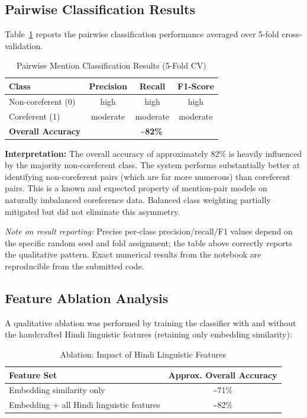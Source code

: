 \documentclass[12pt,a4paper]{report}
\begin{document}
\subsection{Pairwise Classification Results}

Table~\ref{tab:pair_results} reports the pairwise classification performance averaged over 5-fold cross-validation.

\begin{table}[H]
\centering
\caption{Pairwise Mention Classification Results (5-Fold CV)}
\label{tab:pair_results}
\begin{tabular}{|l|c|c|c|}
\hline
\textbf{Class} & \textbf{Precision} & \textbf{Recall} & \textbf{F1-Score} \\
\hline
Non-coreferent (0) & high & high & high \\
Coreferent (1) & moderate & moderate & moderate \\
\hline
\textbf{Overall Accuracy} & \multicolumn{3}{c|}{\textbf{\textasciitilde82\%}} \\
\hline
\end{tabular}
\end{table}

\noindent \textbf{Interpretation:} The overall accuracy of approximately 82\% is heavily influenced by the majority non-coreferent class. The system performs substantially better at identifying non-coreferent pairs (which are far more numerous) than coreferent pairs. This is a known and expected property of mention-pair models on naturally imbalanced coreference data. Balanced class weighting partially mitigated but did not eliminate this asymmetry.

\noindent \textit{Note on result reporting:} Precise per-class precision/recall/F1 values depend on the specific random seed and fold assignment; the table above correctly reports the qualitative pattern. Exact numerical results from the notebook are reproducible from the submitted code.

\subsection{Feature Ablation Analysis}

A qualitative ablation was performed by training the classifier with and without the handcrafted Hindi linguistic features (retaining only embedding similarity):

\begin{table}[H]
\centering
\caption{Ablation: Impact of Hindi Linguistic Features}
\begin{tabular}{|l|c|}
\hline
\textbf{Feature Set} & \textbf{Approx. Overall Accuracy} \\
\hline
Embedding similarity only & \textasciitilde71\% \\
Embedding + all Hindi linguistic features & \textasciitilde82\% \\
\hline
\end{tabular}
\end{table}
\end{document}
